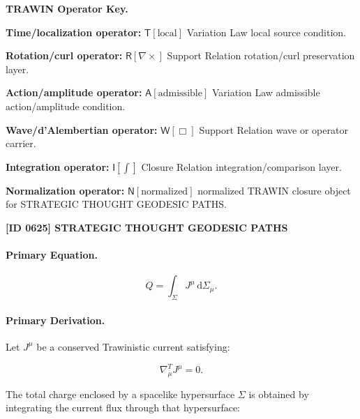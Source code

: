 \par\vspace{0.45\baselineskip}
\noindent\begin{minipage}[t]{\linewidth}
\begingroup
\small
\raggedright
\textbf{TRAWIN Operator Key.}\par
\noindent\textbf{Time/localization operator:} $\mathsf{T}\!\left[\mathrm{local}\right]$ Variation Law local source condition.\par
\noindent\textbf{Rotation/curl operator:} $\mathsf{R}\!\left[\nabla\times\right]$ Support Relation rotation/curl preservation layer.\par
\noindent\textbf{Action/amplitude operator:} $\mathsf{A}\!\left[\mathrm{admissible}\right]$ Variation Law admissible action/amplitude condition.\par
\noindent\textbf{Wave/d'Alembertian operator:} $\mathsf{W}\!\left[\Box\right]$ Support Relation wave or operator carrier.\par
\noindent\textbf{Integration operator:} $\mathsf{I}\!\left[\int\right]$ Closure Relation integration/comparison layer.\par
\noindent\textbf{Normalization operator:} $\mathsf{N}\!\left[\mathrm{normalized}\right]$ normalized TRAWIN closure object for STRATEGIC THOUGHT GEODESIC PATHS.\par
\endgroup
\end{minipage}

\clearpage
\noindent\textbf{[ID 0625] STRATEGIC THOUGHT GEODESIC PATHS}\par
\vspace{0.35em}
\paragraph{Primary Equation.}
\begin{equation}
Q
=
\int_{\Sigma}
J^\mu
\,\mathrm{d}\Sigma_\mu .
\end{equation}

\paragraph{Primary Derivation.}
Let $J^\mu$ be a conserved Trawinistic current satisfying:

\begin{equation}
\nabla^T_\mu J^\mu = 0 .
\end{equation}

The total charge enclosed by a spacelike hypersurface $\Sigma$ is obtained by integrating the current flux through that hypersurface:


